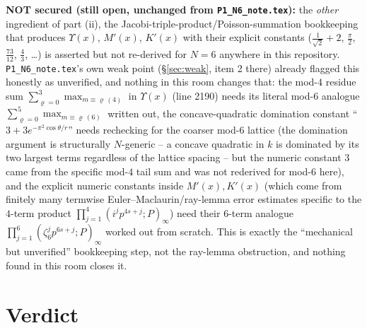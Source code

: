 \documentclass[11pt]{article}
\begin{document}
\textbf{NOT secured (still open, unchanged from \texttt{P1\_N6\_note.tex}):} the \emph{other}
ingredient of part (ii), the Jacobi-triple-product/Poisson-summation bookkeeping that produces
$\Upsilon(x)$, $M'(x)$, $K'(x)$ with their explicit constants ($\frac1{\sqrt2}+2$, $\frac\pi2$,
$\frac{73}{12}$, $\frac43$, \ldots) is asserted but not re-derived for $N=6$ anywhere in this
repository. \texttt{P1\_N6\_note.tex}'s own weak point (\S\ref{sec:weak}, item 2 there) already
flagged this honestly as unverified, and nothing in this room changes that: the mod-$4$ residue
sum $\sum_{\varrho=0}^{3}\max_{m\equiv\varrho\,(4)}$ in $\Upsilon(x)$ (line 2190) needs its literal
mod-$6$ analogue $\sum_{\varrho=0}^{5}\max_{m\equiv\varrho\,(6)}$ written out, the concave-quadratic
domination constant ``$3+3e^{-\pi^2\cos\theta/r}$'' needs rechecking for the coarser mod-$6$
lattice (the domination argument is structurally $N$-generic -- a concave quadratic in $k$ is
dominated by its two largest terms regardless of the lattice spacing -- but the numeric constant
$3$ came from the specific mod-$4$ tail sum and was not rederived for mod-$6$ here), and the
explicit numeric constants inside $M'(x),K'(x)$ (which come from finitely many termwise
Euler--Maclaurin/ray-lemma error estimates specific to the $4$-term product
$\prod_{j=1}^4(i^jp^{4s+j};P)_\infty$) need their $6$-term analogue
$\prod_{j=1}^6(\zeta_6^jp^{6s+j};P)_\infty$ worked out from scratch. This is exactly the
``mechanical but unverified'' bookkeeping step, not the ray-lemma obstruction, and nothing found
in this room closes it.

\section*{Verdict}
\end{document}
